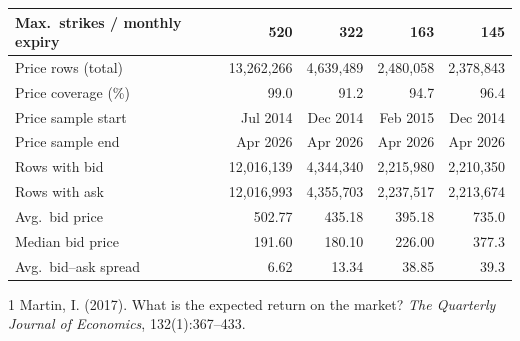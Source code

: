 \documentclass[12pt]{article}
\begin{document}
\begin{table}[ht]
\begin{tabular}{lrrrr}
Max.\ strikes / monthly expiry & 520 & 322 & 163 & 145 \\
\midrule
Price rows (total) & 13{,}262{,}266 & 4{,}639{,}489 & 2{,}480{,}058 & 2{,}378{,}843 \\
Price coverage (\%) & 99.0 & 91.2 & 94.7 & 96.4 \\
Price sample start & Jul 2014 & Dec 2014 & Feb 2015 & Dec 2014 \\
Price sample end & Apr 2026 & Apr 2026 & Apr 2026 & Apr 2026 \\
Rows with bid & 12{,}016{,}139 & 4{,}344{,}340 & 2{,}215{,}980 & 2{,}210{,}350 \\
Rows with ask & 12{,}016{,}993 & 4{,}355{,}703 & 2{,}237{,}517 & 2{,}213{,}674 \\
Avg.\ bid price & 502.77 & 435.18 & 395.18 & 735.0 \\
Median bid price & 191.60 & 180.10 & 226.00 & 377.3 \\
Avg.\ bid--ask spread & 6.62 & 13.34 & 38.85 & 39.3 \\
\bottomrule
\end{tabular}
\end{table}


\begin{thebibliography}{1}
Martin, I. (2017).
\newblock What is the expected return on the market?
\newblock \textit{The Quarterly Journal of Economics}, 132(1):367--433.
\end{thebibliography}
\end{document}
